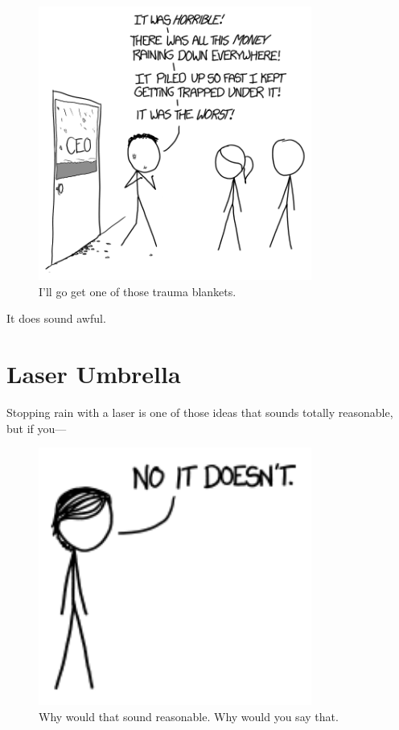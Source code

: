 {\begin{figure}[!htbp]
\centering
\includegraphics[scale=0.5, max width=0.8\textwidth]{imgs/a/118/worst.png}
\caption{I'll go get one of those trauma blankets.}
\end{figure}

{It does sound awful.}

{
\chapter{Laser Umbrella}
}

\hfill{}

{Stopping rain with a laser is one of those ideas that sounds totally reasonable, but if you—}

\begin{figure}[!htbp]
\centering
\includegraphics[scale=0.5, max width=0.8\textwidth]{imgs/a/119/no.png}
\caption{Why would that sound reasonable. Why would you say that.}
\end{figure}

}
